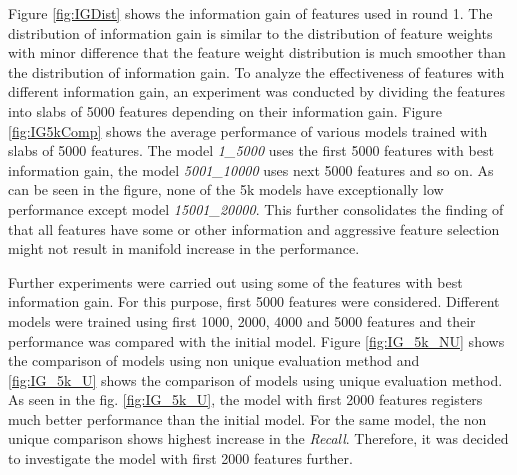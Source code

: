 Figure \ref{fig:IGDist} shows the information gain of features used in round 1. The distribution of information gain is similar to the distribution of feature weights with minor difference that the feature weight distribution is much smoother than the distribution of information gain. To analyze the effectiveness of features with different information gain, an experiment was conducted by dividing the features into slabs of 5000 features depending on their information gain. Figure \ref{fig:IG5kComp} shows the average performance of various models trained with slabs of 5000 features. The model \textit{1\_5000} uses the first 5000 features with best information gain, the model \textit{5001\_10000} uses next 5000 features and so on. As can be seen in the figure, none of the 5k models have exceptionally low performance except model \textit{15001\_20000}. This further consolidates the finding of \cite{joachims1998text} that all features have some or other information and aggressive feature selection might not result in manifold increase in the performance.

Further experiments were carried out using some of the features with best information gain. For this purpose, first 5000 features were considered. Different models were trained using first 1000, 2000, 4000 and 5000 features and their performance was compared with the initial model.  Figure \ref{fig:IG_5k_NU} shows the comparison of models using non unique evaluation method and \ref{fig:IG_5k_U} shows the comparison of models using unique evaluation method. As seen in the fig. \ref{fig:IG_5k_U}, the model with first 2000 features registers much better performance than the initial model. For the same model, the non unique comparison shows highest increase in the \textit{Recall}. Therefore, it was decided to investigate the model with first 2000 features further.

